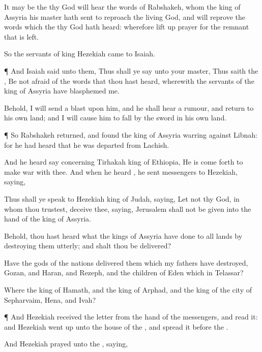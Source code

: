 {It may be the
{} thy
God will
hear the
words of
Rabshakeh, whom the
king of
Assyria his
master hath
sent to
reproach the
living
God, and will
reprove the
words which the
{} thy
God hath
heard: wherefore lift
up
{}
prayer for the
remnant that is
left.

So the
servants of
king
Hezekiah
came to
Isaiah.


\par }{\PP {}¶ And
Isaiah
said unto them, Thus shall ye
say unto your
master, Thus
saith the
{}, Be not
afraid
of the
words that thou hast
heard, wherewith the
servants of the
king of
Assyria have
blasphemed me.

Behold, I will
send a
blast upon him, and he shall
hear a
rumour, and
return to his own
land; and I will cause him to
fall by the
sword in his own
land.


\par }{\PP {}¶ So
Rabshakeh
returned, and
found the
king of
Assyria
warring against
Libnah: for he had
heard that he was
departed from
Lachish.

And he
heard
say concerning
Tirhakah
king of
Ethiopia, He is come
forth to make
war with thee. And when he
heard
{}, he
sent
messengers to
Hezekiah,
saying,

Thus shall ye
speak to
Hezekiah
king of
Judah,
saying, Let not thy
God, in whom thou
trustest,
deceive thee,
saying,
Jerusalem shall not be
given into the
hand of the
king of
Assyria.

Behold, thou hast
heard what the
kings of
Assyria have
done to all
lands by destroying them
utterly; and shalt thou be
delivered?

Have the
gods of the
nations
delivered them which my
fathers have
destroyed,
{}
Gozan, and
Haran, and
Rezeph, and the
children of
Eden which
{} in
Telassar?

Where
{} the
king of
Hamath, and the
king of
Arphad, and the
king of the
city of
Sepharvaim,
Hena, and
Ivah?


\par }{\PP {}¶ And
Hezekiah
received the
letter from the
hand of the
messengers, and
read it: and
Hezekiah went
up unto the
house of the
{}, and
spread it
before the
{}.

And
Hezekiah
prayed unto the
{},
saying,

}
